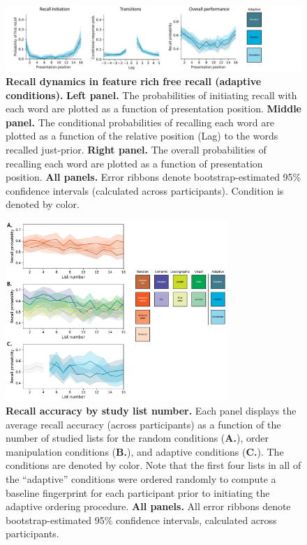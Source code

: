 \documentclass{article}
\begin{document}
\begin{figure}[p] \centering
    \includegraphics[width=\textwidth]{figures/recall_dynamics_adaptive}
    
    \caption{\textbf{Recall dynamics in feature rich free recall (adaptive conditions).} \textbf{Left panel.} The probabilities of
    initiating recall with each word are plotted as a function of presentation
    position. \textbf{Middle panel.} The conditional probabilities of recalling
    each word are plotted as a function of the relative position (Lag) to the words
    recalled just-prior. \textbf{Right panel.} The overall probabilities of
    recalling each word are plotted as a function of presentation position.
    \textbf{All panels.} Error ribbons denote bootstrap-estimated 95\% confidence
    intervals (calculated across participants). Condition is denoted by color.}
    
        \label{fig:recall-dynamics-adaptive}
    \end{figure}


\begin{figure}[tp] \centering
    \includegraphics[width=0.75\textwidth]{figures/accuracy_by_list}
    
\caption{\textbf{Recall accuracy by study list number.} Each panel displays the
average recall accuracy (across participants) as a function of the number of
studied lists for the random conditions (\textbf{A.}), order manipulation
conditions (\textbf{B.}), and adaptive conditions (\textbf{C.}). The conditions
are denoted by color. Note that the first four lists in all of the ``adaptive''
conditions were ordered randomly to compute a baseline fingerprint for each
participant prior to initiating the adaptive ordering procedure. \textbf{All
panels.} All error ribbons denote bootstrap-estimated 95\% confidence
intervals, calculated across participants.} 
\label{fig:accuracy-by-list}

\end{figure}
\end{document}
